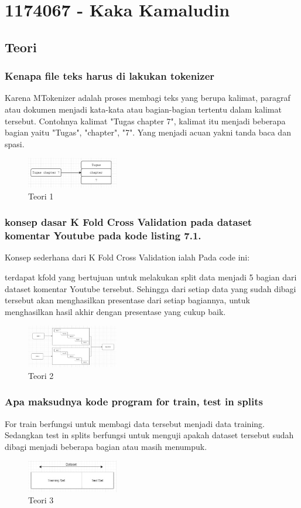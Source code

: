 \section{1174067 - Kaka Kamaludin}
\subsection{Teori}
\subsubsection{Kenapa file teks harus di lakukan tokenizer}
\hfill\break
Karena MTokenizer adalah proses membagi teks yang berupa kalimat, paragraf atau dokumen menjadi kata-kata atau bagian-bagian tertentu dalam kalimat tersebut. Contohnya kalimat "Tugas chapter 7", kalimat itu menjadi beberapa bagian yaitu "Tugas", "chapter", "7". Yang menjadi acuan yakni tanda baca dan spasi.
\begin{figure}[H]
\centering
	\includegraphics[width=4cm]{figures/1174067/7/1.jpg}
\caption{Teori 1}
\end{figure}

\subsubsection{konsep dasar K Fold Cross Validation pada dataset komentar Youtube pada kode listing 7.1.}
\hfill\break
Konsep sederhana dari K Fold Cross Validation ialah Pada code ini:

terdapat kfold yang bertujuan untuk melakukan split data menjadi 5 bagian dari dataset komentar Youtube tersebut. Sehingga dari setiap data yang sudah dibagi tersebut akan menghasilkan presentase dari setiap bagiannya, untuk menghasilkan hasil akhir dengan presentase yang cukup baik.
\begin{figure}[H]
\centering
	\includegraphics[width=4cm]{figures/1174067/7/2.jpg}
\caption{Teori 2}
\end{figure}

\subsubsection{Apa maksudnya kode program for train, test in splits}
\hfill\break
For train berfungsi untuk membagi data tersebut menjadi data training. Sedangkan test in splits berfungsi untuk menguji apakah dataset tersebut sudah dibagi menjadi beberapa bagian atau masih menumpuk.
\begin{figure}[H]
\centering
	\includegraphics[width=4cm]{figures/1174067/7/3.jpg}
\caption{Teori 3}
\end{figure}

